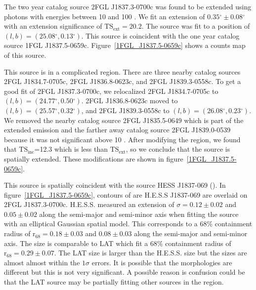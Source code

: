\documentclass[12pt,preprint]{aastex}
\newcommand{\gev}{\text{GeV}\xspace}
\newcommand{\tev}{\text{TeV}\xspace}
\newcommand{\tsext}{{\ensuremath{\text{TS}_\text{ext}}}\xspace}
\newcommand{\tsinc}{\ensuremath{\text{TS}_\text{inc}}\xspace}
\newcommand{\rsixeight}{{\ensuremath{\text{r}_{68}}}\xspace}
\renewcommand{\deg}{\ensuremath{^\circ}\xspace}
\begin{document}


The two year catalog source 2FGL J1837.3-0700c was found to be
extended using photons with energies between 10 \gev and 100 \gev.
We fit an extension of $0.35\deg\pm0.08\deg$ with an extension
significance of $\tsext=20.2$.  The source was fit to a position of
$(l,b)=(25.08\deg,0.13\deg)$.  This source is coincident with the one
year catalog source 1FGL J1837.5-0659c.  Figure~\ref{1FGL_J1837.5-0659c}
shows a counts map of this source.

This source is in a complicated region. There are three nearby catalog
sources 
2FGL J1834.7-0705c, 2FGL J1836.8-0623c, and 2FGL J1839.3-0558c.
To get a good fit of 2FGL J1837.3-0700c,
we relocalized 
2FGL J1834.7-0705c to $(l,b)=(24.77\deg,0.50\deg)$.  
2FGL J1836.8-0623c moved to $(l,b)=(25.57\deg,0.32\deg)$, and 
2FGL J1839.3-0558c to $(l,b)=(26.08\deg,0.23\deg)$.  
We removed the nearby catalog source 2FGL J1835.5-0649 which is part
of the extended emission and the farther away catalog
source 2FGL J1839.0-0539 because it was not significant above 10 \gev.
After modifying the region, we found that \tsinc=12.3 which is less
than \tsext, so we conclude that the source is spatially extended. These
modifications are shown in figure~\ref{1FGL_J1837.5-0659c}.

This source is spatially coincident with the \tev source HESS J1837-069 (\cite{HESS_plane_survey}).
In figure~\ref{1FGL_J1837.5-0659c}, contours of 
are H.E.S.S J1837-069 are overlaid on 
2FGL J1837.3-0700c. H.E.S.S. measured an extension of
$\sigma=0.12\pm0.02$ and $0.05\pm0.02$ along the semi-major and 
semi-minor axis when fitting the source
with an elliptical Gaussian spatial model.
This corresponds to a 68\% containment radius of $\rsixeight=0.18\pm0.03$ and $0.08\pm0.03$ 
along the semi-major and semi-minor axis. The size is comparable to LAT 
which fit a 68\% containment radius of
$\rsixeight=0.29\pm0.07$.
The LAT size is larger than the H.E.S.S. size but the sizes are almost almost within
the $1\sigma$ errors. It is possible that the morphologies are different but
this is not very significant.
A possible reason is confusion could be that the LAT source may be partially
fitting other sources in the region.
\end{document}
